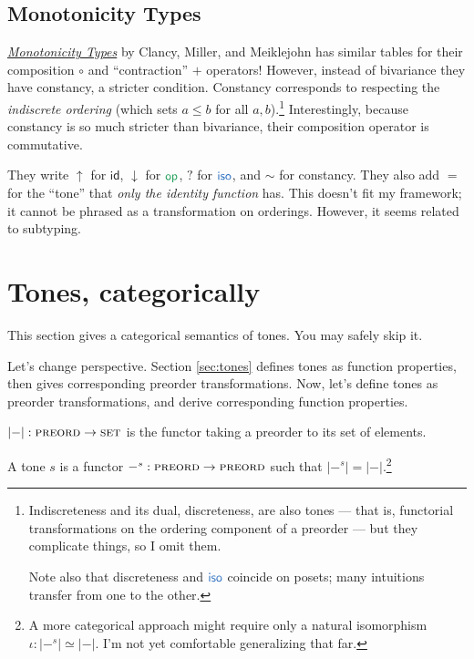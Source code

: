 \documentclass[b5,wide,libertine,ribbons]{rntz}
\newcommand{\ms}[1]{\ensuremath{\mathsf{#1}}}
\newcommand{\cat}[1]{\textsc{#1}} %
\newcommand{\Pre}{\cat{preord}}
\newcommand{\Set}{\cat{set}}
\newcommand{\isoto}{\simeq}
\newcommand{\id}{\ms{id}}
\newcommand{\op}{\ms{op}}
\newcommand{\iso}{\ms{iso}}     %
\newcommand{\tm}{\id}                   %
\newcommand{\ta}{{\color{ACMGreen}\op}} %
\newcommand{\ti}{{\color{ACMBlue}\iso}} %
\renewcommand{\ta}{{\color{ForestGreen}\op}}   %
\renewcommand{\ti}{{\color{NavyBlue}\iso}}     %
\begin{document}
\subsection{Monotonicity Types}

\href{https://infoscience.epfl.ch/record/231867/files/monotonicity-types.pdf}{\emph{Monotonicity
    Types}} by Clancy, Miller, and Meiklejohn has similar tables for their
composition $\circ$ and ``contraction'' $+$ operators! However, instead of
bivariance they have constancy, a stricter condition.
%
Constancy corresponds to respecting the \emph{indiscrete ordering} (which sets
$a \le b$ for all $a,b$).\footnote{Indiscreteness and its dual, discreteness,
  are also tones --- that is, functorial transformations on the ordering
  component of a preorder --- but they complicate things, so I omit them.

  Note also that discreteness and $\ti$ coincide on posets; many intuitions
  transfer from one to the other.}
%
Interestingly, because constancy is so much stricter than bivariance, their
composition operator is commutative.

They write $\uparrow$ for $\tm$, $\downarrow$ for $\ta$, $?$ for $\ti$, and
$\sim$ for constancy. They also add $=$ for the ``tone'' that \emph{only the
  identity function} has. This doesn't fit my framework; it cannot be phrased as
a transformation on orderings. However, it seems related to subtyping.



\section{Tones, categorically}

\newcommand{\elemset}[1]{\ensuremath{|{#1}|}}
\newcommand{\elemsetfn}[0]{\elemset{-}}

This section gives a categorical semantics of tones. You may safely skip it.

Let's change perspective. Section \ref{sec:tones} defines tones as function
properties, then gives corresponding preorder transformations. Now, let's define
tones as preorder transformations, and derive corresponding function properties.

\begin{definition}
  $\elemsetfn : \Pre \to \Set$ is the functor taking a preorder to its set of
  elements.
\end{definition}

\begin{definition}[Tones]\label{def:tone}
  A tone $s$ is a functor $-^s : \Pre \to \Pre$ such that $\elemset{-^s} =
  \elemsetfn$.\footnote{A more categorical approach might require only a natural
    isomorphism \(\iota : \elemset{-^s} \isoto \elemsetfn\). I'm not yet
    comfortable generalizing that far. }
\end{definition}
\end{document}

